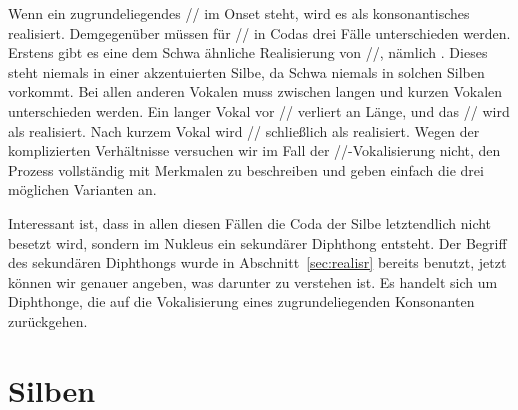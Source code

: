 \begin{exe}
  \ex\label{ex:phol9906}
  \begin{xlist}
  \end{xlist}
\end{exe}

Wenn ein zugrundeliegendes // im Onset steht, wird es als konsonantisches \textipa{[K]} realisiert.
Demgegenüber müssen für // in Codas drei Fälle unterschieden werden.
Erstens gibt es eine dem Schwa ähnliche Realisierung von //, nämlich \textipa{[5]}.
Dieses steht niemals in einer akzentuierten Silbe, da Schwa niemals in solchen Silben vorkommt.
Bei allen anderen Vokalen muss zwischen langen und kurzen Vokalen unterschieden werden.
Ein langer Vokal vor // verliert an Länge, und das // wird als \textipa{[5]} realisiert.
Nach kurzem Vokal wird // schließlich als \textipa{[@]} realisiert.
Wegen der komplizierten Verhältnisse versuchen wir im Fall der //-Vokalisierung nicht, den Prozess vollständig mit Merkmalen zu beschreiben und geben einfach die drei möglichen Varianten an.


Interessant ist, dass in allen diesen Fällen die Coda der Silbe letztendlich nicht besetzt wird, sondern im Nukleus ein sekundärer Diphthong entsteht.
Der Begriff des sekundären Diphthongs wurde in Abschnitt~\ref{sec:realisr} bereits benutzt, jetzt können wir genauer angeben, was darunter zu verstehen ist.
Es handelt sich um Diphthonge, die auf die Vokalisierung eines zugrundeliegenden Konsonanten zurückgehen.

\section{Silben}

\label{sec:phonotaktik}


